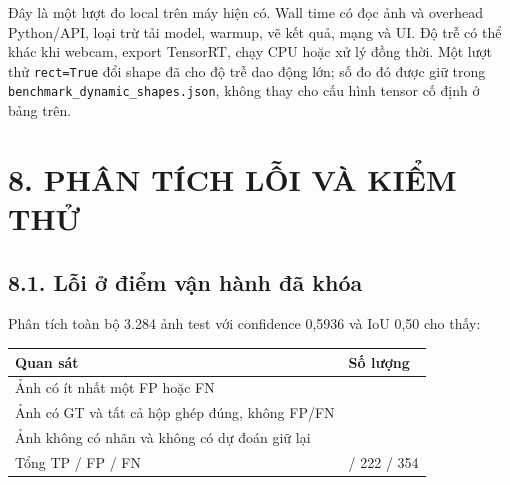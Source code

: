 \documentclass[
  vietnamese,
  12pt,
  a4paper,
]{article}
\newcounter{none} %
\begin{document}
\endgroup

Đây là một lượt đo local trên máy hiện có. Wall time có đọc ảnh và
overhead Python/API, loại trừ tải model, warmup, vẽ kết quả, mạng và UI.
Độ trễ có thể khác khi webcam, export TensorRT, chạy CPU hoặc xử lý đồng
thời. Một lượt thử
\texttt{r\allowbreak{}e\allowbreak{}c\allowbreak{}t\allowbreak{}=\allowbreak{}T\allowbreak{}r\allowbreak{}u\allowbreak{}e\allowbreak{}}
đổi shape đã cho độ trễ dao động lớn; số đo đó được giữ trong
\texttt{b\allowbreak{}e\allowbreak{}n\allowbreak{}c\allowbreak{}h\allowbreak{}m\allowbreak{}a\allowbreak{}r\allowbreak{}k\allowbreak{}\_\allowbreak{}d\allowbreak{}y\allowbreak{}n\allowbreak{}a\allowbreak{}m\allowbreak{}i\allowbreak{}c\allowbreak{}\_\allowbreak{}s\allowbreak{}h\allowbreak{}a\allowbreak{}p\allowbreak{}e\allowbreak{}s\allowbreak{}.\allowbreak{}j\allowbreak{}s\allowbreak{}o\allowbreak{}n\allowbreak{}},
không thay cho cấu hình tensor cố định ở bảng trên.

\section{8. PHÂN TÍCH LỖI VÀ KIỂM
THỬ}\label{phuxe2n-tuxedch-lux1ed7i-vuxe0-kiux1ec3m-thux1eed}

\subsection{8.1. Lỗi ở điểm vận hành đã
khóa}\label{lux1ed7i-ux1edf-ux111iux1ec3m-vux1eadn-huxe0nh-ux111uxe3-khuxf3a}

Phân tích toàn bộ 3.284 ảnh test với confidence 0,5936 và IoU 0,50 cho
thấy:

\begingroup\small\setlength{\tabcolsep}{4pt}\renewcommand{\arraystretch}{1.12}

{\def\LTcaptype{none} %
\begin{longtable}[]{@{}
  >{\raggedright\arraybackslash}p{}
  >{\raggedleft\arraybackslash}p{}@{}}
\toprule\noalign{}
\begin{minipage}[b]{\linewidth}\raggedright
Quan sát
\end{minipage} & \begin{minipage}[b]{\linewidth}\raggedleft
Số lượng
\end{minipage} \\
\midrule\noalign{}
\endhead
\bottomrule\noalign{}
\endlastfoot
Ảnh có ít nhất một FP hoặc FN & 382 \\
Ảnh có GT và tất cả hộp ghép đúng, không FP/FN & 2.829 \\
Ảnh không có nhãn và không có dự đoán giữ lại & 73 \\
Tổng TP / FP / FN & 5.316 / 222 / 354 \\
\end{longtable}
}
\end{document}
